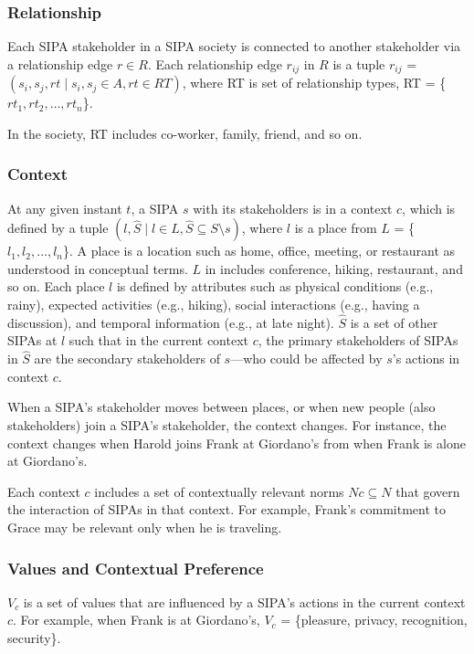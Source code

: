 \subsubsection{Relationship}
Each SIPA stakeholder in a SIPA society is connected to another stakeholder via a relationship edge $r \in R$. 
Each relationship edge $r_{ij}$ in $R$ is a tuple $r_{ij}$ = $(s_i, s_j,
rt \mid s_i, s_j \in A, rt \in RT)$, where 
RT is set of
relationship types, RT = \{$rt_1, rt_2, \ldots, rt_n$\}. 

In the \locationapp society, RT includes co-worker, family, friend, and so on. 

\subsubsection{Context}
At any given instant $t$, a SIPA $s$ with its stakeholders is in a context $c$, which is defined by a
tuple $(l, \hat{S} \mid l \in L, \hat{S} \subseteq S \setminus s)$, where $l$ is a place from $L$ = \{$l_1, l_2, \ldots, l_n$\}. A place is a location such as home, office, meeting, or restaurant as understood in conceptual terms. $L$ in \locationapp includes conference, hiking, restaurant, and so on.
Each place $l$ is defined by attributes such as physical conditions (e.g., rainy), expected activities (e.g., hiking), social interactions (e.g., having a discussion), and temporal information (e.g., at late night).
$\hat{S}$ is a set of other SIPAs at $l$ such that in the current context $c$, the primary stakeholders of SIPAs in $\hat{S}$ are the secondary stakeholders of $s$---who could be affected by $s$'s actions in context $c$. 

When a SIPA's stakeholder moves between places, or when new people (also stakeholders) join a SIPA's stakeholder, the context changes. For instance, the context changes when Harold joins Frank at Giordano's from when Frank is alone at Giordano's. 

Each context $c$ includes a set of contextually relevant norms $Nc \subseteq N$ that govern the interaction of SIPAs in that context. For example, Frank's commitment to Grace may be relevant only when he is traveling. 

\subsubsection{Values and Contextual Preference}
$V_c$ is a set of values that are influenced by a SIPA's actions in the current context $c$. 
% 
For example, when Frank is at Giordano's, $V_c$ = \{pleasure, privacy, recognition, security\}.


